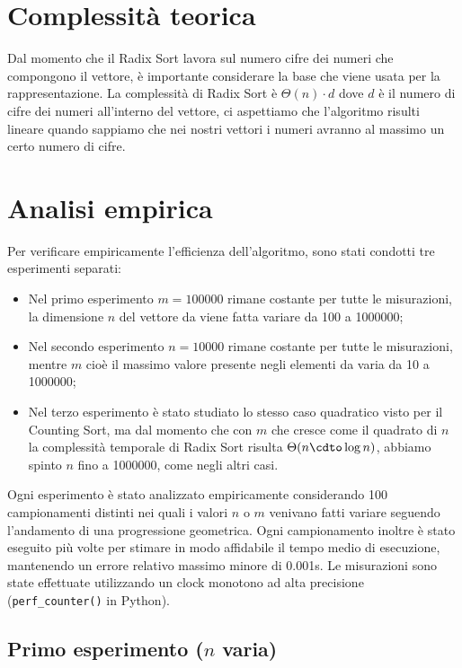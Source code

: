 \documentclass[a4paper, 12pt, oneside]{book}
\begin{document}
\section{Complessità teorica}

Dal momento che il Radix Sort lavora sul numero cifre dei numeri che compongono il vettore, è importante considerare la base che viene usata per la rappresentazione.
La complessità di Radix Sort è $\Theta(n)\cdot d$ dove $d$ è il numero di cifre dei numeri all'interno del vettore, ci aspettiamo che l'algoritmo risulti lineare quando sappiamo che nei nostri vettori i numeri avranno al massimo un certo numero di cifre.


\section{Analisi empirica}

Per verificare empiricamente l'efficienza dell'algoritmo, sono stati condotti tre esperimenti separati:

\begin{itemize}
    \item Nel primo esperimento \(m = 100000\) rimane costante per tutte le misurazioni, la dimensione \(n\) del vettore da viene fatta variare da 100 a 1000000;
    \item Nel secondo esperimento \(n = 10000\) rimane costante per tutte le misurazioni, mentre \(m\) cioè il massimo valore presente negli elementi da varia da 10 a 1000000;
    \item Nel terzo esperimento è stato studiato lo stesso caso quadratico visto per il Counting Sort, ma dal momento che con \(m\) che cresce come il quadrato di \(n\) la complessità temporale di Radix Sort risulta \(\Theta(n \cdto \log n)\), abbiamo spinto \(n\) fino a 1000000, come negli altri casi.
\end{itemize}

\noindent Ogni esperimento è stato analizzato empiricamente considerando 100 campionamenti distinti nei quali i valori $n$ o $m$ venivano fatti variare seguendo l'andamento di una progressione geometrica.
Ogni campionamento inoltre è stato eseguito più volte per stimare in modo affidabile il tempo medio di esecuzione, mantenendo un errore relativo massimo minore di 0.001s.
Le misurazioni sono state effettuate utilizzando un clock monotono ad alta precisione (\texttt{perf\_counter()} in Python). \\


\subsection{Primo esperimento ($n$ varia)}
\end{document}
